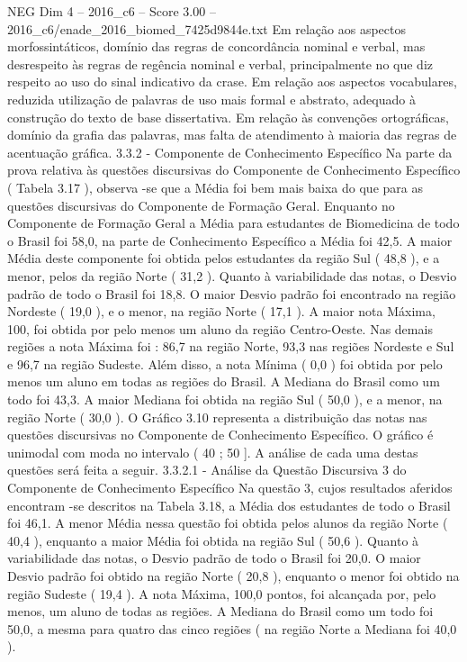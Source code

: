 \begin{textsample}{NEG Dim 4 – 2016\_c6 – Score 3.00 – 2016\_c6/enade\_2016\_biomed\_7425d9844e.txt}
Em relação aos aspectos morfossintáticos, domínio das regras de concordância nominal e verbal, mas desrespeito às regras de regência nominal e verbal, principalmente no que diz respeito ao uso do sinal indicativo da crase.
Em relação aos aspectos vocabulares, reduzida utilização de palavras de uso mais formal e abstrato, adequado à construção do texto de base dissertativa.
Em relação às convenções ortográficas, domínio da grafia das palavras, mas falta de atendimento à maioria das regras de acentuação gráfica. 3.3.2 - Componente de Conhecimento Específico Na parte da prova relativa às questões discursivas do Componente de Conhecimento Específico ( Tabela 3.17 ), observa -se que a Média foi bem mais baixa do que para as questões discursivas do Componente de Formação Geral.
Enquanto no Componente de Formação Geral a Média para estudantes de Biomedicina de todo o Brasil foi 58,0, na parte de Conhecimento Específico a Média foi 42,5.
A maior Média deste componente foi obtida pelos estudantes da região Sul ( 48,8 ), e a menor, pelos da região Norte ( 31,2 ).
Quanto à variabilidade das notas, o Desvio padrão de todo o Brasil foi 18,8.
O maior Desvio padrão foi encontrado na região Nordeste ( 19,0 ), e o menor, na região Norte ( 17,1 ).
A maior nota Máxima, 100, foi obtida por pelo menos um aluno da região Centro-Oeste.
Nas demais regiões a nota Máxima foi : 86,7 na região Norte, 93,3 nas regiões Nordeste e Sul e 96,7 na região Sudeste.
Além disso, a nota Mínima ( 0,0 ) foi obtida por pelo menos um aluno em todas as regiões do Brasil.
A Mediana do Brasil como um todo foi 43,3.
A maior Mediana foi obtida na região Sul ( 50,0 ), e a menor, na região Norte ( 30,0 ).
O Gráfico 3.10 representa a distribuição das notas nas questões discursivas no Componente de Conhecimento Específico.
O gráfico é unimodal com moda no intervalo ( 40 ; 50 ].
A análise de cada uma destas questões será feita a seguir. 3.3.2.1 - Análise da Questão Discursiva 3 do Componente de Conhecimento Específico Na questão 3, cujos resultados aferidos encontram -se descritos na Tabela 3.18, a Média dos estudantes de todo o Brasil foi 46,1.
A menor Média nessa questão foi obtida pelos alunos da região Norte ( 40,4 ), enquanto a maior Média foi obtida na região Sul ( 50,6 ).
Quanto à variabilidade das notas, o Desvio padrão de todo o Brasil foi 20,0.
O maior Desvio padrão foi obtido na região Norte ( 20,8 ), enquanto o menor foi obtido na região Sudeste ( 19,4 ).
A nota Máxima, 100,0 pontos, foi alcançada por, pelo menos, um aluno de todas as regiões.
A Mediana do Brasil como um todo foi 50,0, a mesma para quatro das cinco regiões ( na região Norte a Mediana foi 40,0 ).

\end{textsample}
